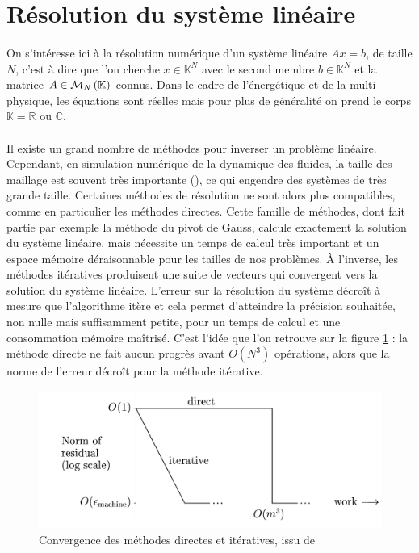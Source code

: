 \section{Résolution du système linéaire}

	\paragraph{}
	On s'intéresse ici à la résolution numérique d'un système linéaire $Ax = b$, de taille $N$, c'est à dire que l'on cherche $x\in\mathbb{K}^N$ avec le second membre $b\in\mathbb{K}^N$ et la matrice $A\in\mathcal{M}_{N}\left(\mathbb{K}\right)$ connus.
	Dans le cadre de l'énergétique et de la multi-physique, les équations sont réelles mais pour plus de généralité on prend le corps $\mathbb{K} = \mathbb{R}\textrm{ ou }\mathbb{C}$.

	\paragraph{}
	Il existe un grand nombre de méthodes pour inverser un problème linéaire.
	Cependant, en simulation numérique de la dynamique des fluides, la taille des maillage est souvent très importante (), ce qui engendre des systèmes de très grande taille.
	Certaines méthodes de résolution ne sont alors plus compatibles, comme en particulier les méthodes directes.
	Cette famille de méthodes, dont fait partie par exemple la méthode du pivot de Gauss, calcule exactement la solution du système linéaire, mais nécessite un temps de calcul très important et un espace mémoire déraisonnable pour les tailles de nos problèmes.
	À l'inverse, les méthodes itératives produisent une suite de vecteurs qui convergent vers la solution du système linéaire.
	L'erreur sur la résolution du système décroît à mesure que l'algorithme itère et cela permet d'atteindre la précision souhaitée, non nulle mais suffisamment petite, pour un temps de calcul et une consommation mémoire maîtrisé.
	C'est l'idée que l'on retrouve sur la figure \ref{fig:direct-iterative} : la méthode directe ne fait aucun progrès avant $O\left(N^3\right)$ opérations, alors que la norme de l'erreur décroît pour la méthode itérative.

	\begin{figure}
		\centering
		\includegraphics[width=.8\textwidth]{images/direct-iterative.png}
		\caption{Convergence des méthodes directes et itératives, issu de \cite{TrefethenBau1997}}
		\label{fig:direct-iterative}
	\end{figure}


